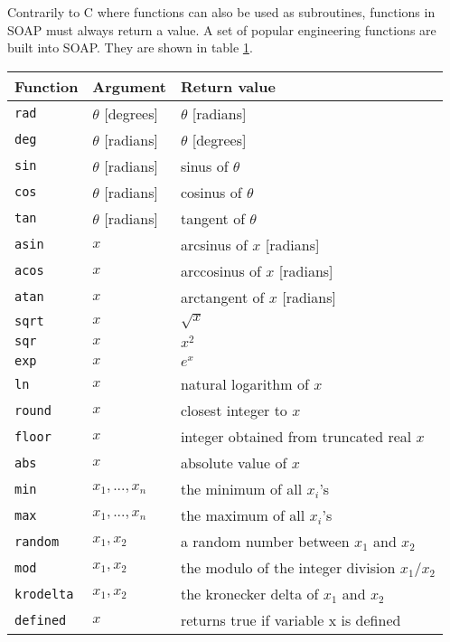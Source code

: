 \documentclass{warpdoc}
\newcommand{\tablespacing}{\vspace{-0.4cm}}
\renewcommand{\fontsizetable}{\footnotesize\scalefont{1.0}}
\begin{document}
Contrarily to C where functions
can also be used as subroutines, functions in SOAP must always return a value.
A set of popular engineering functions are built into SOAP. They
are shown in table \ref{table:functions}.
%
\begin{table}[ht]
\fontsizetable
\vspace{0.3cm}
\begin{center}
  \begin{threeparttable}
    \begin{tabular}{lll}
      \toprule
        Function & Argument               & Return value\\
      \midrule
        \verb|rad|   & $\theta$ [degrees] & $\theta$ [radians]\\
        \verb|deg|   & $\theta$ [radians] & $\theta$ [degrees]\\
        \verb|sin|   & $\theta$ [radians] & sinus of $\theta$\\
        \verb|cos|   & $\theta$ [radians] & cosinus of $\theta$\\
        \verb|tan|   & $\theta$ [radians] & tangent of $\theta$\\
        \verb|asin|  & $x$                & arcsinus of $x$ [radians]\\
        \verb|acos|  & $x$                & arccosinus of $x$ [radians]\\
        \verb|atan|  & $x$                & arctangent of $x$ [radians]\\
        \verb|sqrt|  & $x$                & $\sqrt{x}$ \\
        \verb|sqr|   & $x$                & $x^2$\\
        \verb|exp|   & $x$                & $e^x$ \\
        \verb|ln|    & $x$                & natural logarithm of $x$ \\
        \verb|round| & $x$                & closest integer to $x$ \\
        \verb|floor| & $x$                & integer obtained from truncated real $x$ \\
        \verb|abs|   & $x$                & absolute value of $x$ \\
        \verb|min|   & $x_1,...,x_n$      & the minimum of all $x_i$'s \\
        \verb|max|   & $x_1,...,x_n$      & the maximum of all $x_i$'s \\
        \verb|random|& $x_1,x_2$          & a random number between $x_1$ and $x_2$ \\
        \verb|mod|   & $x_1,x_2$          & the modulo of the integer division $x_1/x_2$ \\
        \verb|krodelta|& $x_1,x_2$            & the kronecker delta of $x_1$ and $x_2$\\
        \verb|defined|& $x$               & returns true if variable x is defined \\
      \bottomrule
    \end{tabular}
    \label{table:functions}
  \end{threeparttable}
\end{center}
\tablespacing
\end{table}
%
\end{document}
